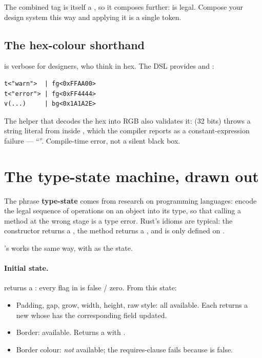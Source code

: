 The combined tag is itself a , so it composes
further:  is legal. Compose your design
system this way and applying it is a single token.

\subsection{The hex-colour shorthand}

 is verbose for designers, who think in hex. The
DSL provides  and :

\begin{lstlisting}
t<"warn">  | fg<0xFFAA00>
t<"error"> | fg<0xFF4444>
v(...)     | bg<0x1A1A2E>
\end{lstlisting}

The  helper that decodes the hex into RGB also
validates it:  (32 bits) throws a string
literal from inside , which the compiler reports as
a constant-expression failure --- ``''. Compile-time error, not a silent black box.

\section{The type-state machine, drawn out}
\label{sec:dsl:state-machine}

The phrase \textbf{type-state} comes from research on programming
languages: encode the legal sequence of operations on an object into
its type, so that calling a method at the wrong stage is a type
error. Rust's  idioms are typical: the constructor
returns a , the  method
returns a , and  is only defined
on .

\maya{}'s  works the same way, with  as
the state.

\paragraph{Initial state.}  returns a
: every flag in
 is false / zero. From this state:

\begin{itemize}[leftmargin=*]
  \item Padding, gap, grow, width, height, raw style: all available.
    Each returns a new  whose  has the
    corresponding field updated.
  \item Border: available. Returns a  with
    .
  \item Border colour: \emph{not} available; the requires-clause
    fails because  is false.
\end{itemize}


